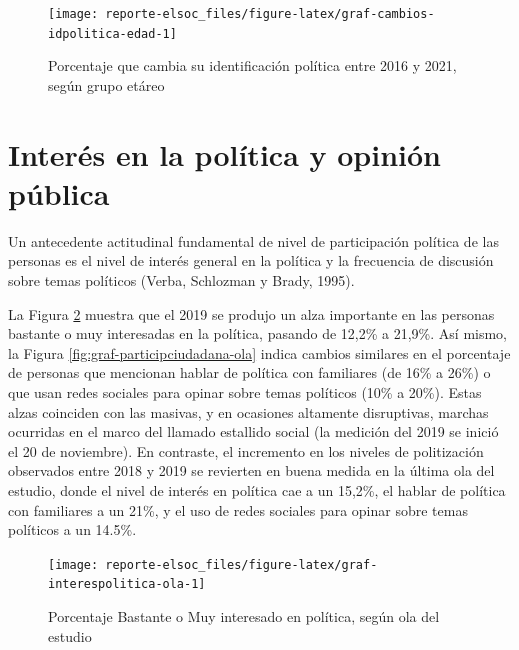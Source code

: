 \documentclass[
  12pt,
]{book}
\begin{document}
\begin{figure}

{\centering \texttt{[image: reporte-elsoc\_files/figure-latex/graf-cambios-idpolitica-edad-1]} 

}

\caption{Porcentaje que cambia su identificación política entre 2016 y 2021, según grupo etáreo}\label{fig:graf-cambios-idpolitica-edad}
\end{figure}

\hypertarget{interuxe9s-en-la-poluxedtica-y-opiniuxf3n-puxfablica}{%
\section{Interés en la política y opinión pública}\label{interuxe9s-en-la-poluxedtica-y-opiniuxf3n-puxfablica}}

Un antecedente actitudinal fundamental de nivel de participación política de las personas es el nivel de interés general en la política y la frecuencia de discusión sobre temas políticos (Verba, Schlozman y Brady, 1995).

La Figura \ref{fig:graf-interespolitica-ola} muestra que el 2019 se produjo un alza importante en las personas bastante o muy interesadas en la política, pasando de 12,2\% a 21,9\%. Así mismo, la Figura \ref{fig:graf-participciudadana-ola} indica cambios similares en el porcentaje de personas que mencionan hablar de política con familiares (de 16\% a 26\%) o que usan redes sociales para opinar sobre temas políticos (10\% a 20\%). Estas alzas coinciden con las masivas, y en ocasiones altamente disruptivas, marchas ocurridas en el marco del llamado estallido social (la medición del 2019 se inició el 20 de noviembre). En contraste, el incremento en los niveles de politización observados entre 2018 y 2019 se revierten en buena medida en la última ola del estudio, donde el nivel de interés en política cae a un 15,2\%, el hablar de política con familiares a un 21\%, y el uso de redes sociales para opinar sobre temas políticos a un 14.5\%.

\begin{figure}

{\centering \texttt{[image: reporte-elsoc\_files/figure-latex/graf-interespolitica-ola-1]} 

}

\caption{Porcentaje Bastante o Muy interesado en política, según ola del estudio}\label{fig:graf-interespolitica-ola}
\end{figure}
\end{document}
